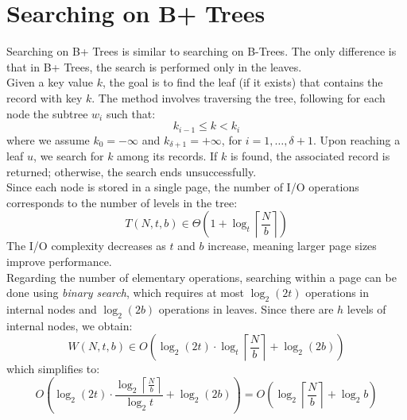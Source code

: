 \documentclass{report}
\begin{document}
\section{Searching on B+ Trees}
Searching on B+ Trees is similar to searching on B-Trees. The only difference is that in B+ Trees, the search is performed only in the leaves.\\
Given a key value \( k \), the goal is to find the leaf (if it exists) that contains the record with key \( k \).  
The method involves traversing the tree, following for each node the subtree \( w_i \) such that:
\[
k_{i-1} \leq k < k_i
\]
\noindent where we assume \( k_0 = -\infty \) and \( k_{\delta+1} = +\infty \), for \( i = 1, \dots, \delta + 1 \).  
Upon reaching a leaf \( u \), we search for \( k \) among its records.  
If \( k \) is found, the associated record is returned; otherwise, the search ends unsuccessfully.  \\
Since each node is stored in a single page, the number of I/O operations corresponds to the number of levels in the tree:
\begin{equation}
T(N, t, b) \in \Theta\left( 1 + \log_t \left\lceil \frac{N}{b} \right\rceil \right)
\end{equation}
\noindent
The I/O complexity decreases as \( t \) and \( b \) increase, meaning larger page sizes improve performance. \\
Regarding the number of elementary operations, searching within a page can be done using \textit{binary search},  
which requires at most \( \log_2 (2t) \) operations in internal nodes and \( \log_2 (2b) \) operations in leaves.  
Since there are \( h \) levels of internal nodes, we obtain:
\begin{equation}
W(N, t, b) \in O \left( \log_2 (2t) \cdot \log_t \left\lceil \frac{N}{b} \right\rceil + \log_2 (2b) \right)
\end{equation}
\noindent
which simplifies to:
\begin{equation}
O \left( \log_2 (2t) \cdot \frac{\log_2 \left\lceil \frac{N}{b} \right\rceil}{\log_2 t} + \log_2 (2b) \right) = O \left( \log_2 \left\lceil \frac{N}{b} \right\rceil + \log_2 b \right)
\end{equation}
\end{document}

